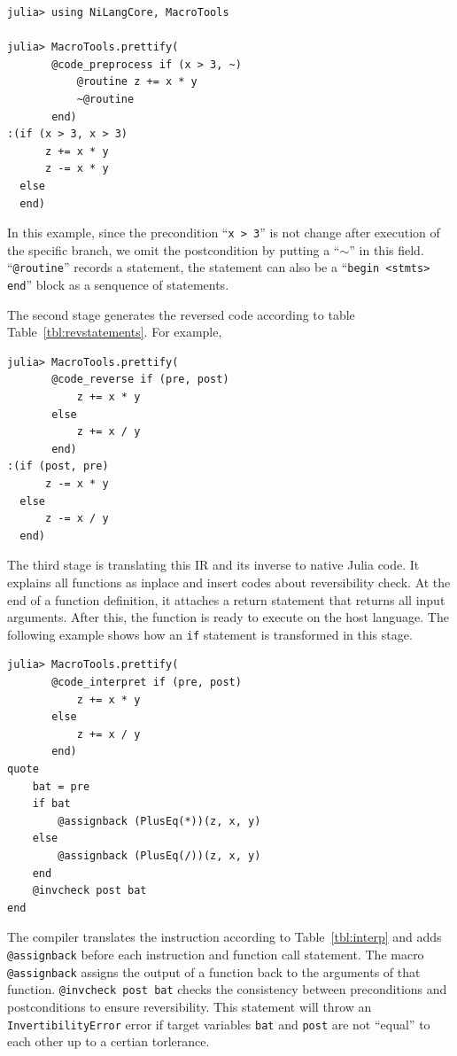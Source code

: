 \documentclass[aps,twocolumn,longbibliography,english,superscriptaddress]{revtex4-1}
\newcommand{\<}{\langle}
\renewcommand{\>}{\rangle}
\newcommand{\Tbl}[1]{Table~\ref{#1}}
\theoremstyle{definition}\newtheorem{definition}{\textit{Definition}}
\begin{document}
\begin{minipage}{.44\textwidth}
\begin{lstlisting}
julia> using NiLangCore, MacroTools

julia> MacroTools.prettify(
       @code_preprocess if (x > 3, ~)
           @routine z += x * y
           ~@routine
       end)
:(if (x > 3, x > 3)
      z += x * y
      z -= x * y
  else
  end)
\end{lstlisting}
\end{minipage}

In this example, since the precondition ``\texttt{x > 3}'' is not change after execution of the specific branch, we omit the postcondition by putting a ``$\sim$'' in this field. ``\texttt{@routine}'' records a statement, the statement can also be a ``\texttt{begin <stmts> end}'' block as a senquence of statements.

The second stage generates the reversed code according to table \Tbl{tbl:revstatements}. For example,

\begin{minipage}{.44\textwidth}
\begin{lstlisting}
julia> MacroTools.prettify(
       @code_reverse if (pre, post)
           z += x * y
       else
           z += x / y
       end)
:(if (post, pre)
      z -= x * y
  else
      z -= x / y
  end)
\end{lstlisting}
\end{minipage}

The third stage is translating this IR and its inverse to native Julia code. It explains all functions as inplace and insert codes about reversibility check. At the end of a function definition, it attaches a return statement that returns all input arguments.
After this, the function is ready to execute on the host language.
The following example shows how an \texttt{if} statement is transformed in this stage.

\begin{minipage}{.44\textwidth}
\begin{lstlisting}
julia> MacroTools.prettify(
       @code_interpret if (pre, post)
           z += x * y
       else
           z += x / y
       end)
quote
    bat = pre
    if bat
        @assignback (PlusEq(*))(z, x, y)
    else
        @assignback (PlusEq(/))(z, x, y)
    end
    @invcheck post bat
end
\end{lstlisting}
\end{minipage}

The compiler translates the instruction according to \Tbl{tbl:interp} and adds \texttt{@assignback} before each instruction and function call statement. The macro \texttt{@assignback} assigns the output of a function back to the arguments of that function. \texttt{@invcheck post bat} checks the consistency between preconditions and postconditions to ensure reversibility. This statement will throw an \texttt{InvertibilityError} error if target variables \texttt{bat} and \texttt{post} are not ``equal'' to each other up to a certian torlerance.
\end{document}
